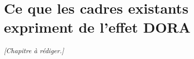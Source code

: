 \chapter{Ce que les cadres existants expriment de l'effet DORA}
\label{ch:benchmarks}

\textit{[Chapitre à rédiger.]}

%
